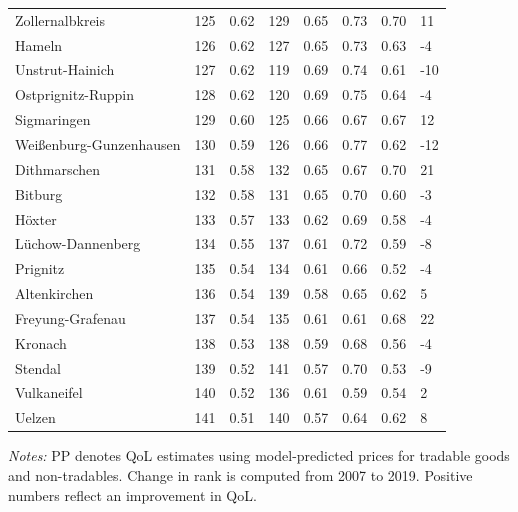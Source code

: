 \documentclass[11pt,a4paper]{article}
\begin{document}
{\begin{longtable}{llllllll}
Zollernalbkreis & 125 & 0.62 & 129 & 0.65 & 0.73 & 0.70 & 11 \\
Hameln & 126 & 0.62 & 127 & 0.65 & 0.73 & 0.63 & -4 \\
Unstrut-Hainich & 127 & 0.62 & 119 & 0.69 & 0.74 & 0.61 & -10 \\
Ostprignitz-Ruppin & 128 & 0.62 & 120 & 0.69 & 0.75 & 0.64 & -4 \\
Sigmaringen & 129 & 0.60 & 125 & 0.66 & 0.67 & 0.67 & 12 \\
Weißenburg-Gunzenhausen & 130 & 0.59 & 126 & 0.66 & 0.77 & 0.62 & -12 \\
Dithmarschen & 131 & 0.58 & 132 & 0.65 & 0.67 & 0.70 & 21 \\
Bitburg & 132 & 0.58 & 131 & 0.65 & 0.70 & 0.60 & -3 \\
Höxter & 133 & 0.57 & 133 & 0.62 & 0.69 & 0.58 & -4 \\
Lüchow-Dannenberg & 134 & 0.55 & 137 & 0.61 & 0.72 & 0.59 & -8 \\
Prignitz & 135 & 0.54 & 134 & 0.61 & 0.66 & 0.52 & -4 \\
Altenkirchen & 136 & 0.54 & 139 & 0.58 & 0.65 & 0.62 & 5 \\
Freyung-Grafenau & 137 & 0.54 & 135 & 0.61 & 0.61 & 0.68 & 22 \\
Kronach & 138 & 0.53 & 138 & 0.59 & 0.68 & 0.56 & -4 \\
Stendal & 139 & 0.52 & 141 & 0.57 & 0.70 & 0.53 & -9 \\
Vulkaneifel & 140 & 0.52 & 136 & 0.61 & 0.59 & 0.54 & 2 \\
Uelzen & 141 & 0.51 & 140 & 0.57 & 0.64 & 0.62 & 8 
\end{longtable}
} %
\vspace{-3mm}\hspace{0.1cm}\noindent\parbox{0.9\linewidth}{\scriptsize \emph{Notes:} PP denotes QoL estimates using model-predicted prices for tradable goods and non-tradables. Change in rank is computed from 2007 to 2019. Positive numbers reflect an improvement in QoL.}
\end{document}
